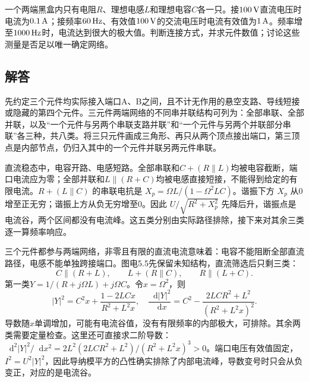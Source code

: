 \documentclass[UTF8,fontset=fandol,a4paper,11pt]{ctexart}
\newcommand{\dd}{\mathop{}\!\mathrm{d}}
\newcommand{\figcaption}[1]{\par\vspace{2pt}{\small\color{muted}#1}\par}
\begin{document}
一个两端黑盒内只有电阻$R$、理想电感$L$和理想电容$C$各一只。接$100\,{\rm V}$直流电压时电流为$0.1\,{\rm A}$；接频率$60\,{\rm Hz}$、有效值$100\,{\rm V}$的交流电压时电流有效值为$1\,{\rm A}$。频率增至$1000\,{\rm Hz}$时，电流达到很大的极大值。判断连接方式，并求元件数值；讨论这些测量是否足以唯一确定网络。

\begin{center}\begin{minipage}{.98\linewidth}\centering
{}
\figcaption{图电5.5\quad 根据端口的直流、交流和峰频测量反推网络}
\end{minipage}\end{center}

\subsection*{解答}


先约定三个元件均实际接入端口A、B之间，且不计无作用的悬空支路、导线短接或隐藏的第四个元件。三元件两端网络的不同串并联结构可列为：全部串联、全部并联，以及“一个元件与另两个串联支路并联”和“一个元件与另两个并联部分串联”各三种，共八类。将三只元件画成三角形、再只从两个顶点接出端口，第三顶点是内部节点，仍归入其中的一个元件并联另两元件串联。

直流稳态中，电容开路、电感短路。全部串联和$C+(R\parallel L)$均被电容截断，端口电流应为零；全部并联和$L\parallel(R+C)$均被电感直接短接，不能得到给定的有限电流。$R+(L\parallel C)$ 的串联电抗是 $X_p=\Omega L/(1-\Omega^2LC)$。谐振下方 $X_p$ 从0增至正无穷；谐振上方从负无穷增至0。因此 $U/\sqrt{R^2+X_p^2}$ 先降后升，谐振点是电流谷，两个区间都没有电流峰。这五类分别由实际路径排除，接下来对其余三类逐一算频率响应。

三个元件都参与两端网络，非零且有限的直流电流意味着：电容不能阻断全部直流路径，电感不能单独跨接端口。图电5.5先保留未知结构，直流筛选后只剩三类：
\[
 C\parallel(R+L),\qquad L+(R\parallel C),\qquad R\parallel(L+C).
\]
第一类$Y=1/(R+j\Omega L)+j\Omega C$。令$x=\Omega^2$，则
\[
 |Y|^2=C^2x+\frac{1-2LCx}{R^2+L^2x},\quad
 \frac{\dd|Y|^2}{\dd x}
 =C^2-\frac{2LCR^2+L^2}{(R^2+L^2x)^2}.
\]
导数随$x$单调增加，可能有电流谷值，没有有限频率的内部极大，可排除。其余两类需要定量检查。这里还可直接求二阶导数：$\dd^2|Y|^2/\dd x^2=2L^2(2LCR^2+L^2)/(R^2+L^2x)^3>0$。端口电压有效值固定，$I^2=U^2|Y|^2$，因此导纳模平方的凸性确实排除了内部电流峰，导数变号时只会从负变正，对应的是电流谷。
\end{document}
